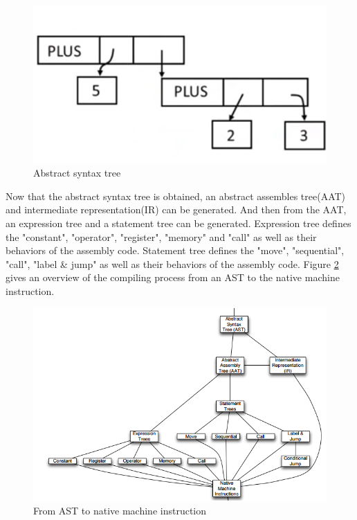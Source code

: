              \begin{figure}[H]
                \centering
                \includegraphics[scale = 0.25]
                {Images/concepts/AST.png}
                \caption[ AST]%
                { Abstract syntax tree\footnotemark}
                \label{fig:AST}
            \end{figure}
             
             
            Now that the abstract syntax tree is obtained, an abstract assembles tree(AAT) and intermediate representation(IR) can be generated. And then from the AAT, an expression tree and a statement tree can be generated. Expression tree defines the "constant", "operator", "register", "memory" and "call" as well as their behaviors of the assembly code. Statement tree defines the "move", "sequential", "call", "label \& jump" as well as their behaviors of the assembly code. Figure \ref{fig:NativeInstruction} gives an overview of the compiling process from an AST to the native machine instruction. 
            
             \begin{figure}
                \centering
                \includegraphics[scale = 0.4]
                {Images/concepts/NativeInstruction.png}
                \caption[From AST to assembly]%
                {From AST to native machine instruction\footnotemark}    \label{fig:NativeInstruction}
            \end{figure}
             
